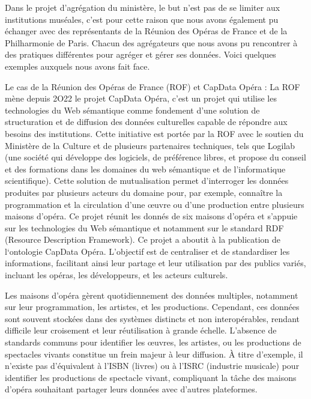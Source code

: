 Dans le projet d’agrégation du ministère, le but n’est pas de se limiter aux institutions muséales, c’est pour cette raison que nous avons également pu échanger avec des représentants de la Réunion des Opéras de France et de la Philharmonie de Paris. 
Chacun des agrégateurs que nous avons pu rencontrer à des pratiques différentes pour agréger et gérer ses données. Voici quelques exemples auxquels nous avons fait face. \newline

Le cas de la Réunion des Opéras de France (ROF) et CapData Opéra : 
La ROF mène depuis 2O22 le projet CapData Opéra, c’est un projet qui utilise les technologies du Web sémantique comme fondement d’une solution de structuration et de diffusion des données culturelles capable de répondre aux besoins des institutions. Cette initiative est portée par la ROF avec le soutien du Ministère de la Culture et de plusieurs partenaires techniques, tels que Logilab (une société qui développe des logiciels, de préférence libres, et propose du conseil et des formations dans les domaines du web sémantique et de l'informatique scientifique). Cette solution de mutualisation permet d’interroger les données produites par plusieurs acteurs du domaine pour, par exemple, connaître la programmation et la circulation d’une œuvre ou d’une production entre plusieurs maisons d’opéra. Ce projet réunit les donnés de six maisons d’opéra et s’appuie sur les technologies du Web sémantique et notamment sur le standard RDF (Resource Description Framework). Ce projet a aboutit à la publication de l‘ontologie CapData Opéra. \newline
L'objectif est de centraliser et de standardiser les informations, facilitant ainsi leur partage et leur utilisation par des publics variés, incluant les opéras, les développeurs, et les acteurs culturels.\newline

Les maisons d'opéra gèrent quotidiennement des données multiples, notamment sur leur programmation, les artistes, et les productions. Cependant, ces données sont souvent stockées dans des systèmes distincts et non interopérables, rendant difficile leur croisement et leur réutilisation à grande échelle. L'absence de standards communs pour identifier les œuvres, les artistes, ou les productions de spectacles vivants constitue un frein majeur à leur diffusion. À titre d'exemple, il n'existe pas d'équivalent à l'ISBN (livres) ou à l'ISRC (industrie musicale) pour identifier les productions de spectacle vivant, compliquant la tâche des maisons d’opéra souhaitant partager leurs données avec d’autres plateformes. \newline


